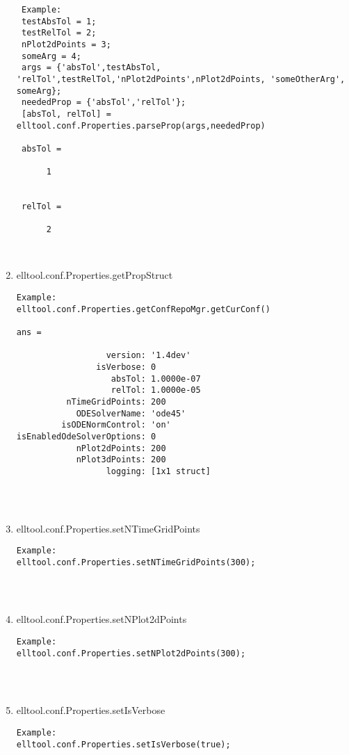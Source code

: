 \begin{enumerate}
\begin{lstlisting}
 Example:
 testAbsTol = 1;
 testRelTol = 2;
 nPlot2dPoints = 3;
 someArg = 4;
 args = {'absTol',testAbsTol, 'relTol',testRelTol,'nPlot2dPoints',nPlot2dPoints, 'someOtherArg', someArg};
 neededProp = {'absTol','relTol'};
 [absTol, relTol] = elltool.conf.Properties.parseProp(args,neededProp)

 absTol =

      1


 relTol =

      2



\end{lstlisting}
\fontfamily{\familydefault}
\selectfont
\item {elltool.conf.Properties.getPropStruct}
\selectfont
\begin{lstlisting}
Example:
elltool.conf.Properties.getConfRepoMgr.getCurConf()

ans =

                  version: '1.4dev'
                isVerbose: 0
                   absTol: 1.0000e-07
                   relTol: 1.0000e-05
          nTimeGridPoints: 200
            ODESolverName: 'ode45'
         isODENormControl: 'on'
isEnabledOdeSolverOptions: 0
            nPlot2dPoints: 200
            nPlot3dPoints: 200
                  logging: [1x1 struct]




\end{lstlisting}
\fontfamily{\familydefault}
\selectfont
\item {elltool.conf.Properties.setNTimeGridPoints}
\selectfont
\begin{lstlisting}
Example:
elltool.conf.Properties.setNTimeGridPoints(300);




\end{lstlisting}
\fontfamily{\familydefault}
\selectfont
\item {elltool.conf.Properties.setNPlot2dPoints}
\selectfont
\begin{lstlisting}
Example:
elltool.conf.Properties.setNPlot2dPoints(300);




\end{lstlisting}
\fontfamily{\familydefault}
\selectfont
\item {elltool.conf.Properties.setIsVerbose}
\selectfont
\begin{lstlisting}
Example:
elltool.conf.Properties.setIsVerbose(true);





\end{lstlisting}
\end{enumerate}
